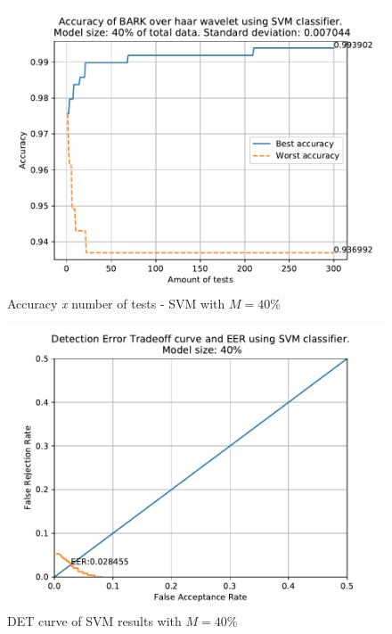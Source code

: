 	\begin{figure}[H]
		\centering
		\includegraphics[scale=.8]{images/results/confusionMatrices/classifier_SVM_40.pdf}
		\caption{Accuracy \textit{x} number of tests - SVM with $M=40\%$}
		\label{fig:classifiersvm40}
	\end{figure}
	\begin{figure}[H]
		\centering
		\includegraphics[scale=.8]{images/results/det/DET_for_classifier_SVM_40.pdf}
		\caption{DET curve of SVM results with $M=40\%$}
		\label{fig:detsvm40}
	\end{figure}
